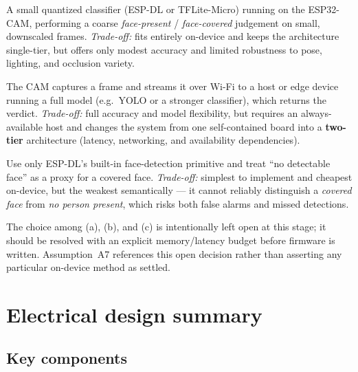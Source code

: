\documentclass[11pt,a4paper]{article}
\begin{document}
\begin{description}[leftmargin=1.4cm, style=nextline]
    \item[(a) Tiny on-device classifier.] A small quantized classifier
        (ESP-DL or TFLite-Micro) running on the ESP32-CAM, performing a
        coarse \emph{face-present} / \emph{face-covered} judgement on small,
        downscaled frames.  \textit{Trade-off:} fits entirely on-device and
        keeps the architecture single-tier, but offers only modest accuracy and
        limited robustness to pose, lighting, and occlusion variety.
    \item[(b) Off-device inference (two-tier).] The CAM captures a frame and
        streams it over Wi-Fi to a host or edge device running a full model
        (e.g.\ YOLO or a stronger classifier), which returns the verdict.
        \textit{Trade-off:} full accuracy and model flexibility, but requires an
        always-available host and changes the system from one self-contained
        board into a \textbf{two-tier} architecture (latency, networking, and
        availability dependencies).
    \item[(c) Built-in face detection as a coverage proxy.] Use only ESP-DL's
        built-in face-detection primitive and treat ``no detectable face'' as a
        proxy for a covered face.  \textit{Trade-off:} simplest to implement and
        cheapest on-device, but the weakest semantically --- it cannot reliably
        distinguish a \emph{covered face} from \emph{no person present}, which
        risks both false alarms and missed detections.
\end{description}

The choice among (a), (b), and (c) is intentionally left open at this stage; it
should be resolved with an explicit memory/latency budget before firmware is
written.  Assumption~A7 references this open decision rather than asserting any
particular on-device method as settled.

\section{Electrical design summary}
\label{sec:electrical}

\subsection{Key components}
\end{document}
